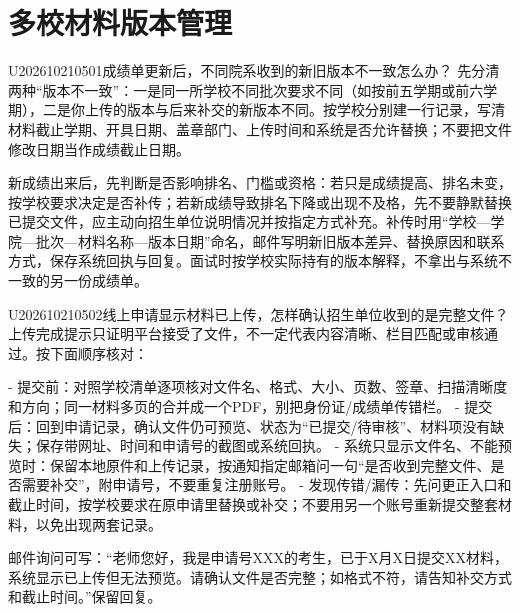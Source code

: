 \section{多校材料版本管理}
\begin{qa}{U202610210501}{成绩单更新后，不同院系收到的新旧版本不一致怎么办？}
先分清两种“版本不一致”：一是同一所学校不同批次要求不同（如按前五学期或前六学期），二是你上传的版本与后来补交的新版本不同。按学校分别建一行记录，写清材料截止学期、开具日期、盖章部门、上传时间和系统是否允许替换；不要把文件修改日期当作成绩截止日期。

新成绩出来后，先判断是否影响排名、门槛或资格：若只是成绩提高、排名未变，按学校要求决定是否补传；若新成绩导致排名下降或出现不及格，先不要静默替换已提交文件，应主动向招生单位说明情况并按指定方式补充。补传时用“学校—学院—批次—材料名称—版本日期”命名，邮件写明新旧版本差异、替换原因和联系方式，保存系统回执与回复。面试时按学校实际持有的版本解释，不拿出与系统不一致的另一份成绩单。
\end{qa}
\begin{qa}{U202610210502}{线上申请显示材料已上传，怎样确认招生单位收到的是完整文件？}
上传完成提示只证明平台接受了文件，不一定代表内容清晰、栏目匹配或审核通过。按下面顺序核对：

- 提交前：对照学校清单逐项核对文件名、格式、大小、页数、签章、扫描清晰度和方向；同一材料多页的合并成一个PDF，别把身份证/成绩单传错栏。
- 提交后：回到申请记录，确认文件仍可预览、状态为“已提交/待审核”、材料项没有缺失；保存带网址、时间和申请号的截图或系统回执。
- 系统只显示文件名、不能预览时：保留本地原件和上传记录，按通知指定邮箱问一句“是否收到完整文件、是否需要补交”，附申请号，不要重复注册账号。
- 发现传错/漏传：先问更正入口和截止时间，按学校要求在原申请里替换或补交；不要用另一个账号重新提交整套材料，以免出现两套记录。

邮件询问可写：“老师您好，我是申请号XXX的考生，已于X月X日提交XX材料，系统显示已上传但无法预览。请确认文件是否完整；如格式不符，请告知补交方式和截止时间。”保留回复。
\end{qa}

